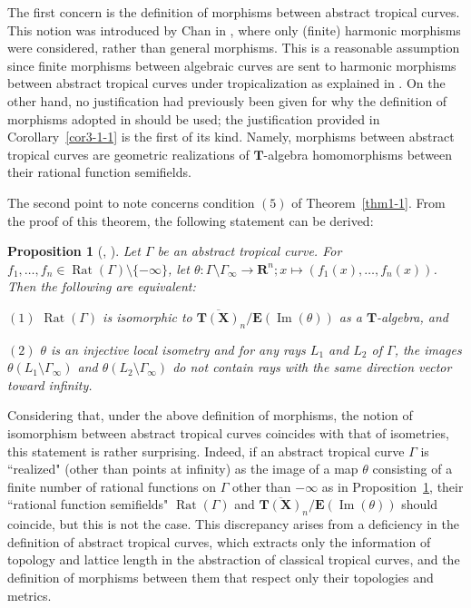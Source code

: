 \documentclass[a4paper,12pt]{amsart}
\newtheorem{prop}[dfn]{Proposition}
\def\Gamma{\varGamma}
\begin{document}
The first concern is the definition of morphisms between abstract tropical curves.
This notion was introduced by Chan in \cite{Chan}, where only (finite) harmonic morphisms were considered, rather than general morphisms.
This is a reasonable assumption since finite morphisms between algebraic curves are sent to harmonic morphisms between abstract tropical curves under tropicalization as explained in \cite{Amini=Baker=Brugalle=Rabinoff}.
On the other hand, no justification had previously been given for why the definition of morphisms adopted in \cite{Chan} should be used; the justification provided in Corollary~\ref{cor3-1-1} is the first of its kind.
Namely, morphisms between abstract tropical curves are geometric realizations of $\boldsymbol{T}$-algebra homomorphisms between their rational function semifields.

The second point to note concerns condition $(5)$ of Theorem~\ref{thm1-1}.
From the proof of this theorem, the following statement can be derived:

\begin{prop}[{\cite[Proposition~3.18]{JuAe5}, \cite[Proposition~3.11]{JuAe4}}]
    \label{prop1-1}
Let $\Gamma$ be an abstract tropical curve.
For $f_1, \ldots, f_n \in \operatorname{Rat}(\Gamma) \setminus \{ -\infty \}$, let $\theta : \Gamma \setminus \Gamma_{\infty} \to \boldsymbol{R}^n; x \mapsto (f_1(x), \ldots, f_n(x))$.
Then the following are equivalent:

$(1)$ $\operatorname{Rat}(\Gamma)$ is isomorphic to $\overline{\boldsymbol{T}(\boldsymbol{X})}_n / \boldsymbol{E}(\operatorname{Im}(\theta))$ as a $\boldsymbol{T}$-algebra, and

$(2)$ $\theta$ is an injective local isometry and for any rays $L_1$ and $L_2$ of $\Gamma$, the images $\theta(L_1 \setminus \Gamma_{\infty})$ and $\theta(L_2 \setminus \Gamma_{\infty})$ do not contain rays with the same direction vector toward infinity.
\end{prop}

Considering that, under the above definition of morphisms, the notion of isomorphism between abstract tropical curves coincides with that of isometries, this statement is rather surprising.
Indeed, if an abstract tropical curve $\Gamma$ is ``realized" (other than points at infinity) as the image of a map $\theta$ consisting of a finite number of rational functions on $\Gamma$ other than $-\infty$ as in Proposition~\ref{prop1-1}, their ``rational function semifields" $\operatorname{Rat}(\Gamma)$ and $\overline{\boldsymbol{T}(\boldsymbol{X})}_n / \boldsymbol{E}(\operatorname{Im}(\theta))$ should coincide, but this is not the case.
This discrepancy arises from a deficiency in the definition of abstract tropical curves, which extracts only the information of topology and lattice length in the abstraction of classical tropical curves, and the definition of morphisms between them that respect only their topologies and metrics.
\end{document}
